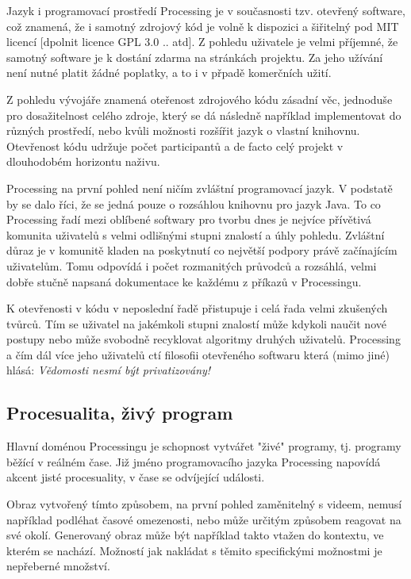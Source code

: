 \documentclass[11pt]{article}
\begin{document}
Jazyk i programovací prostředí Processing je v současnosti tzv. otevřený software, což znamená, že i samotný zdrojový kód je volně k dispozici a šiřitelný pod MIT licencí [dpolnit licence GPL 3.0 .. atd]. Z pohledu uživatele je velmi příjemné, že samotný software je k dostání zdarma na stránkách projektu. Za jeho užívání není nutné platit žádné poplatky, a to i v přpadě komerčních užití.

Z pohledu vývojáře znamená oteřenost zdrojového kódu zásadní věc, jednoduše pro dosažitelnost celého zdroje, který se dá následně například implementovat do různých prostředí, nebo kvůli možnosti rozšířit jazyk o vlastní knihovnu. Otevřenost kódu udržuje počet participantů a de facto celý projekt v dlouhodobém horizontu naživu.

Processing na první pohled není ničím zvláštní programovací jazyk. V podstatě by se dalo říci, že se jedná pouze o rozsáhlou knihovnu pro jazyk Java. To co Processing řadí mezi oblíbené softwary pro tvorbu dnes je nejvíce přívětivá komunita uživatelů s velmi odlišnými stupni znalostí a úhly pohledu. Zvláštní důraz je v komunitě kladen na poskytnutí co největší podpory právě začínajícím uživatelům. Tomu odpovídá i počet rozmanitých průvodců a rozsáhlá, velmi dobře stučně napsaná dokumentace ke každému z příkazů v Processingu.

K otevřenosti v kódu v neposlední řadě přistupuje i celá řada velmi zkušených tvůrců. Tím se uživatel na jakémkoli stupni znalostí může kdykoli naučit nové postupy nebo může svobodně recyklovat algoritmy druhých uživatelů. Processing a čím dál více jeho uživatelů ctí filosofii otevřeného softwaru která (mimo jiné) hlásá: {\em Vědomosti nesmí být privatizovány!}

\subsection{Procesualita, živý program}

Hlavní doménou Processingu je schopnost vytvářet "živé" programy, tj. programy běžící v reálném čase. Již jméno programovacího jazyka Processing napovídá akcent jisté procesuality, v čase se odvíjející události.

Obraz vytvořený tímto způsobem, na první pohled zaměnitelný s videem, nemusí například podléhat časové omezenosti, nebo může určitým způsobem reagovat na své okolí. Generovaný obraz může být například takto vtažen do kontextu, ve kterém se nachází. Možností jak nakládat s těmito specifickými možnostmi je nepřeberné množství.
\end{document}

